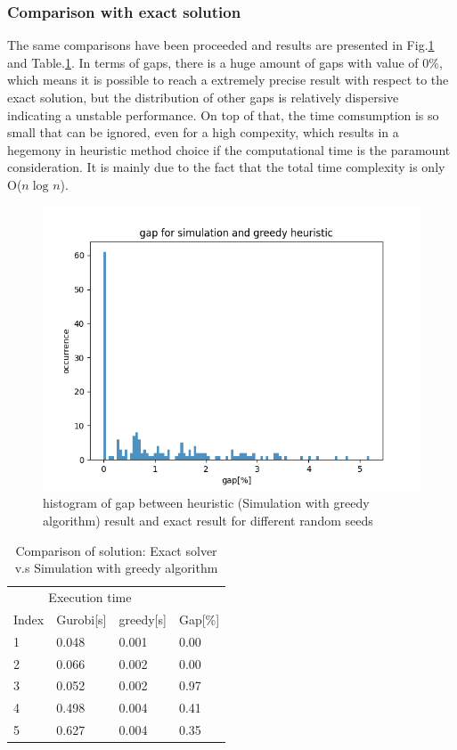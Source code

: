 \documentclass{article}
\begin{document}
\subsubsection{Comparison with exact solution}
The same comparisons have been proceeded and results are presented in Fig.\ref{fig:hist_sg} and Table.\ref{tab:exact_greedy}. In terms of gaps, there is a huge amount of gaps with value of 0\%, which means it is possible to reach a extremely precise result with respect to the exact solution, but the distribution of other gaps is relatively dispersive indicating a unstable performance. On top of that, the time comsumption is so small that can be ignored, even for a high compexity, which results in a hegemony in heuristic method choice if the computational time is the paramount consideration. It is mainly due to the fact that the total time complexity is only O($n\log_{}n$).

\begin{figure}[ht]
    \centering
    \includegraphics[scale=0.7]{hist_sg.png}
    \caption{histogram of gap between heuristic (Simulation with greedy algorithm) result and exact result for different random seeds}
    \label{fig:hist_sg}
\end{figure}

\begin{table}[ht]
 \caption{Comparison of solution: Exact solver v.s Simulation with greedy algorithm}
  \centering
  \begin{tabular}{llll}
    \toprule
    \multicolumn{3}{c}{Execution time}                   \\
    \cmidrule(r){2-3}
    Index   & Gurobi[s]     & greedy[s]      & Gap[\%] \\
    \midrule
    1	&	0.048 	&	0.001 	&	0.00 	\\
    2	&	0.066 	&	0.002 	&	0.00 	\\
    3	&	0.052 	&	0.002 	&	0.97 	\\
    4	&	0.498 	&	0.004 	&	0.41 	\\
    5	&	0.627 	&	0.004 	&	0.35 	\\
    \bottomrule
  \end{tabular}
  \label{tab:exact_greedy}
\end{table}
\end{document}
